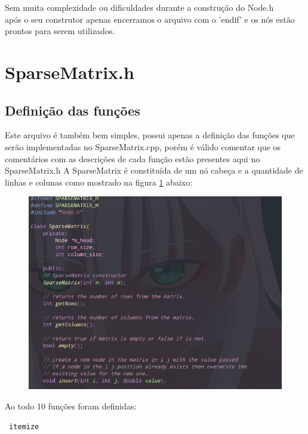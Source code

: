 \documentclass[a4paper,12pt]{article}
\begin{document}
Sem muita complexidade ou dificuldades durante a construção do Node.h \\
após o seu construtor apenas encerramos o arquivo com o 'endif' e os nós estão prontos para serem utilizados.

\section{SparseMatrix.h}
\subsection{Definição das funções}

Este arquivo é também bem simples, possui apenas a definição das funções que serão implementadas no SparseMatrix.cpp, porém é válido comentar que os comentários com as descrições de cada função estão presentes aqui no SparseMatrix.h
A SparseMatrix é constituída de um nó cabeça e a quantidade de linhas e colunas como mostrado na figura \ref{fig:sparsematrixh1} abaixo: 

\begin{figure}[h]
\centering
\includegraphics[width=1\textwidth]{Imagens/sparsematrixH/sparsematrixH-pt1.png}
\caption{\label{fig:sparsematrixh1} }
\end{figure}


Ao todo 10 funções foram definidas:

\texttt{ itemize }
\end{document}
